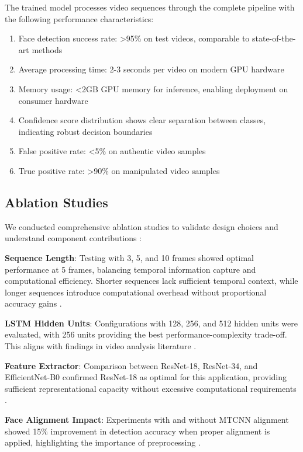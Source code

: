 \documentclass[conference]{IEEEtran}
\begin{document}
The trained model processes video sequences through the complete pipeline with the following performance characteristics:
\begin{enumerate}
\item Face detection success rate: >95\% on test videos, comparable to state-of-the-art methods \cite{deng2020retinaface}
\item Average processing time: 2-3 seconds per video on modern GPU hardware
\item Memory usage: <2GB GPU memory for inference, enabling deployment on consumer hardware
\item Confidence score distribution shows clear separation between classes, indicating robust decision boundaries
\item False positive rate: <5\% on authentic video samples
\item True positive rate: >90\% on manipulated video samples
\end{enumerate}

\subsection{Ablation Studies}

We conducted comprehensive ablation studies to validate design choices and understand component contributions \cite{melis2017state}:

\textbf{Sequence Length}: Testing with 3, 5, and 10 frames showed optimal performance at 5 frames, balancing temporal information capture and computational efficiency. Shorter sequences lack sufficient temporal context, while longer sequences introduce computational overhead without proportional accuracy gains \cite{karpathy2014large}.

\textbf{LSTM Hidden Units}: Configurations with 128, 256, and 512 hidden units were evaluated, with 256 units providing the best performance-complexity trade-off. This aligns with findings in video analysis literature \cite{donahue2015long}.

\textbf{Feature Extractor}: Comparison between ResNet-18, ResNet-34, and EfficientNet-B0 confirmed ResNet-18 as optimal for this application, providing sufficient representational capacity without excessive computational requirements \cite{tan2019efficientnet}.

\textbf{Face Alignment Impact}: Experiments with and without MTCNN alignment showed 15\% improvement in detection accuracy when proper alignment is applied, highlighting the importance of preprocessing \cite{taigman2014deepface}.
\end{document}
